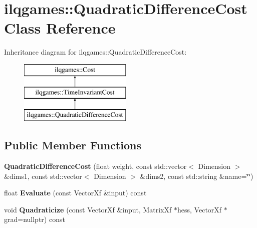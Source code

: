 \hypertarget{classilqgames_1_1_quadratic_difference_cost}{}\section{ilqgames\+:\+:Quadratic\+Difference\+Cost Class Reference}
\label{classilqgames_1_1_quadratic_difference_cost}
Inheritance diagram for ilqgames\+:\+:Quadratic\+Difference\+Cost\+:\begin{figure}[H]
\begin{center}
\leavevmode
\includegraphics[height=3.000000cm]{classilqgames_1_1_quadratic_difference_cost}
\end{center}
\end{figure}
\subsection*{Public Member Functions}
\begin{DoxyCompactItemize}
\item 
{\bfseries Quadratic\+Difference\+Cost} (float weight, const std\+::vector$<$ Dimension $>$ \&dims1, const std\+::vector$<$ Dimension $>$ \&dims2, const std\+::string \&name=\char`\"{}\char`\"{})\hypertarget{classilqgames_1_1_quadratic_difference_cost_afe5dfe4c10ff8fd995f9f0313860883e}{}\label{classilqgames_1_1_quadratic_difference_cost_afe5dfe4c10ff8fd995f9f0313860883e}

\item 
float {\bfseries Evaluate} (const Vector\+Xf \&input) const \hypertarget{classilqgames_1_1_quadratic_difference_cost_adc6943c8b7dee651b61406e1276ecbca}{}\label{classilqgames_1_1_quadratic_difference_cost_adc6943c8b7dee651b61406e1276ecbca}

\item 
void {\bfseries Quadraticize} (const Vector\+Xf \&input, Matrix\+Xf $\ast$hess, Vector\+Xf $\ast$grad=nullptr) const \hypertarget{classilqgames_1_1_quadratic_difference_cost_a6517a15ce3eab80d530b1f0e2ac0a738}{}\label{classilqgames_1_1_quadratic_difference_cost_a6517a15ce3eab80d530b1f0e2ac0a738}

\end{DoxyCompactItemize}
